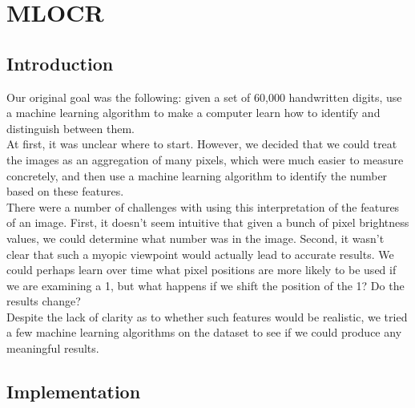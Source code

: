 \documentclass{article}
\theoremstyle{remark}
\begin{document}
	 \section*{MLOCR}
	\label*{Optical Character Recognition using Machine Learning}
	   \subsection*{Introduction}
     Our original goal was the following: given a set of 60,000 handwritten digits, use a machine learning algorithm to make a computer learn how to identify and distinguish between them. \\

     At first, it was unclear where to start. However, we decided that we could treat the images as an aggregation of many pixels, which were much easier to measure concretely, and then use a machine learning algorithm to identify the number based on these features. \\

     There were a number of challenges with using this interpretation of the features of an image. First, it doesn't seem intuitive that given a bunch of pixel brightness values, we could determine what number was in the image. Second, it wasn't clear that such a myopic viewpoint would actually lead to accurate results. We could perhaps learn over time what pixel positions are more likely to be used if we are examining a 1, but what happens if we shift the position of the 1? Do the results change? \\

     Despite the lack of clarity as to whether such features would be realistic, we tried a few machine learning algorithms on the dataset to see if we could produce any meaningful results.
     \subsection*{Implementation}
\end{document}
